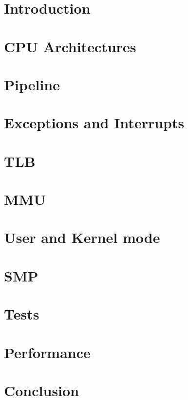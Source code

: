 \documentclass[11pt, twocolumn]{article}
\begin{document}
\clearpage
{}
\setcounter{page}{1}

\noindent


\section{Introduction}




\section{CPU Architectures}



\section{Pipeline}


\section{Exceptions and Interrupts}


\section{TLB}

\section{MMU}


\section{User and Kernel mode}

\section{SMP}

\section{Tests}

\section{Performance}

\section{Conclusion}


\newpage

{}


\newpage

\appendix
\begin{appendices}
\end{appendices}
\end{document}
